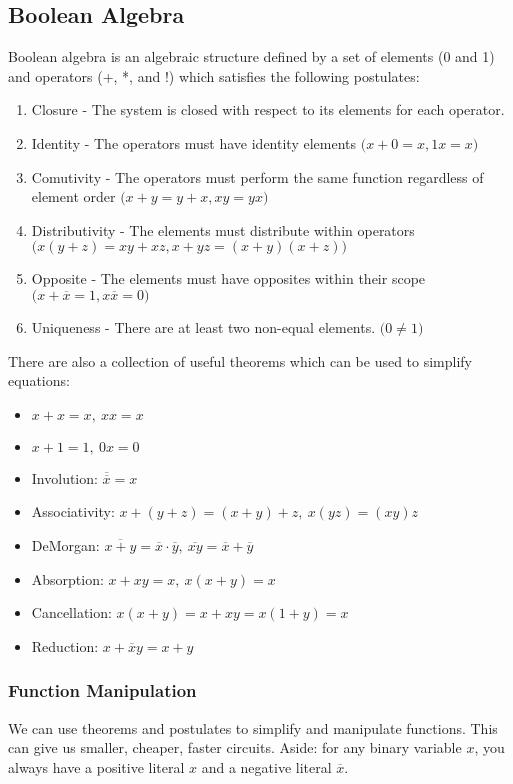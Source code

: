 \documentclass[12pt]{article}
\begin{document}
\subsection*{Boolean Algebra}
Boolean algebra is an algebraic structure defined by a set of elements (0 and 1) and operators (+, *, and !) which satisfies the following postulates:
\begin{enumerate}
\item Closure - The system is closed with respect to its elements for each operator.
\item Identity - The operators must have identity elements $\bigl(x + 0 = x, 1x = x\bigl)$
\item Comutivity - The operators must perform the same function regardless of element order $\bigl(x + y = y + x, xy = yx\bigl)$
\item Distributivity - The elements must distribute within operators $\bigl(x(y + z) = xy + xz, x + yz = (x + y)(x + z)\bigl)$
\item Opposite - The elements must have opposites within their scope $\bigl(x + \overline{x} = 1, x\overline{x} = 0\bigl)$
\item Uniqueness - There are at least two non-equal elements. $\bigl(0 \neq 1\bigl)$
\end{enumerate}

There are also a collection of useful theorems which can be used to simplify equations:
\begin{itemize}
\item $x + x = x,\ xx = x$
\item $x + 1 = 1,\ 0x = 0$
\item Involution: $\overline{\overline{x}} = x$
\item Associativity: $x + (y + z) = (x + y) + z,\ x(yz) = (xy)z$
\item DeMorgan: $\overline{x+y} = \overline{x} \cdot \overline{y},\ \overline{xy} = \overline{x} + \overline{y}$
\item Absorption: $x + xy = x,\ x(x + y) = x$
\item Cancellation: $x(x + y) = x + xy = x(1 + y) = x$
\item Reduction: $x + \overline{x}y = x + y$
\end{itemize}

\subsubsection*{Function Manipulation}
We can use theorems and postulates to simplify and manipulate functions. This can give us smaller, cheaper, faster circuits. Aside: for any binary variable $x$, you always have a positive literal $x$ and a negative literal $\overline{x}$.
\end{document}
